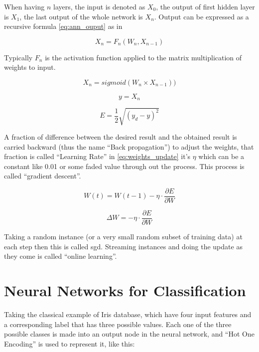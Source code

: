 When having \(n\) layers, the input is denoted as \(X_0\),
the output of first hidden layer is \(X_1\), the last output of the whole network is \(X_n\).
Output can be expressed as a recursive formula \ref{eq:ann_ouput} as in\autocite{lecuniefficient}\autocite{orr1998neural}

\begin{equation}
X_n = F_n(W_n, X_{n-1})
\label{eq:ann_ouput}
\end{equation}

Typically \(F_n\) is the activation function applied to the matrix multiplication of weights to input.

\begin{equation}
X_n = sigmoid( W_n \times X_{n-1}) )
\label{eq:ann_as_matrix}
\end{equation}

\begin{equation}
y = X_n
\end{equation}

\begin{equation}
E = \frac{1}{2} \sqrt{ ( y_{d} - y )^2 }
\end{equation}

A fraction of difference between the desired result and the obtained result is carried backward
(thus the name ``Back propagation'') to adjust the weights,
that fraction is called ``Learning Rate'' in \ref{eq:weights_update} it's \(\eta\)
which can be a constant like 0.01 or some faded value through out the process.
This process is called ``gradient descent''.

\begin{equation}
W(t) = W(t-1) - \eta \cdot \frac{\partial E}{\partial W}
\label{eq:weights_update}
\end{equation}

\begin{equation}
\Delta W = - \eta \cdot \frac{\partial E}{\partial W}
\end{equation}

Taking a random instance (or a very small random subset of training data)
at each step then this is called \gls{sgd}.
Streaming instances and doing the update as they come is called ``online learning''.

\section{Neural Networks for Classification}\label{sec_nn_classification}

Taking the classical example of Iris database, which have four input features
and a corresponding label that has three possible values.
Each one of the three possible classes is made into an output node in the neural network,
and ``Hot One Encoding'' is used to represent it, like this:

